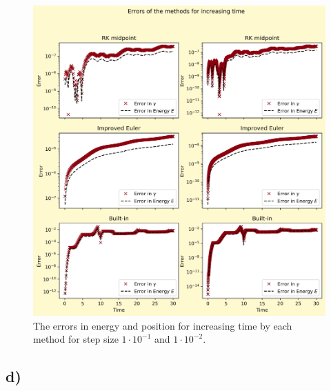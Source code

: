 \documentclass[12pt, a4paper,usenames,dvipsnames]{article}
\begin{document}
\thispagestyle{plain}
\begin{figure}[h!]
    \centering
    \includegraphics[width=\linewidth]{Graphs2d.png}
    \caption{The errors in energy and position for increasing time by each method for step size \(1\cdot10^{-1}\) and \(1\cdot10^{-2}\).}
    \label{fig:gr2d}
\end{figure}
\restoregeometry
\subsection*{d)}
\end{document}
